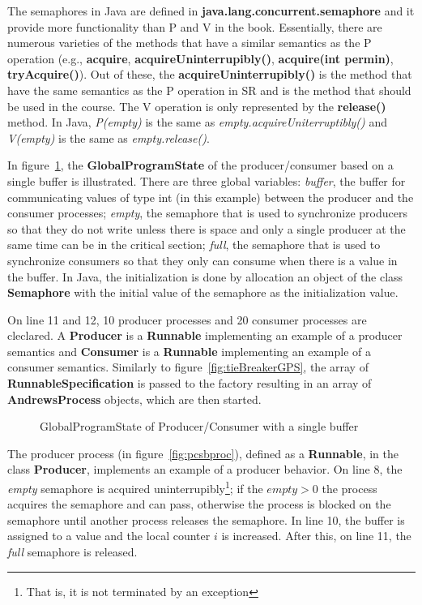 \documentclass[11pt]{article} %
\begin{document}
The semaphores in Java are defined in {\bfseries java.lang.concurrent.semaphore} and it provide more functionality than P and V in the book. Essentially, there are numerous varieties of the methods that have a similar semantics as the P operation (e.g., 
{\bfseries acquire}, {\bfseries acquireUninterrupibly()}, {\bfseries acquire(int permin)}, {\bfseries tryAcquire()}). Out of these, the {\bfseries acquireUninterrupibly()} is the method that have the same semantics as the P operation in SR and is the method that should be used in the course. The V operation is only represented by the {\bfseries release()} method. In Java, \emph{P(empty)} is the same as \emph{empty.acquireUniterruptibly()} and \emph{V(empty)} is the same as \emph{empty.release()}.

In figure~\ref{fig:pcsbgps}, the {\bfseries GlobalProgramState} of the producer/consumer based on a single buffer is illustrated. There are three global variables: \emph{buffer}, the buffer for communicating values of type int (in this example) between the producer and the consumer processes; \emph{empty}, the semaphore that is used to synchronize producers so that they do not write unless there is space and only a single producer at the same time can be in the critical section; \emph{full}, the semaphore that is used to synchronize consumers so that they only can consume when there is  a value in the buffer. In Java, the initialization is done by allocation an object of the class {\bfseries Semaphore} with the initial value of the semaphore as the initialization value. 

On line 11 and 12, 10 producer processes and 20 consumer processes are cleclared. A {\bfseries Producer} is a {\bfseries Runnable} implementing an example of a producer semantics and {\bfseries Consumer} is a {\bfseries Runnable} implementing an example of a consumer semantics. Similarly to figure~\ref{fig:tieBreakerGPS}, the array of {\bfseries RunnableSpecification} is passed to the factory resulting in an array of {\bfseries AndrewsProcess} objects, which are then started. 

\lstset{inputpath=c:/git/IT325G/IT325G/examples/se/his/iit/it325g/examples/semaphores/multipleProducerConsumerSingleBuffer}
\begin{figure}[h]

\caption{GlobalProgramState of Producer/Consumer with a single buffer}
\label{fig:pcsbgps}
\end{figure}

The producer process (in figure~\ref{fig:pcsbproc}), defined as a {\bfseries Runnable}, in the class {\bfseries Producer}, implements an example of a producer behavior. On line 8, the \emph{ empty} semaphore is acquired uninterrupibly\footnote{That is, it is not terminated by an exception}; if the $\textit{empty}>0$ the process acquires the semaphore and can pass, otherwise the process is blocked on the semaphore until another process releases the semaphore. In line 10, the buffer is assigned to a value and the local counter $i$ is increased. After this, on line 11, the \emph{full} semaphore is released.
\end{document}
